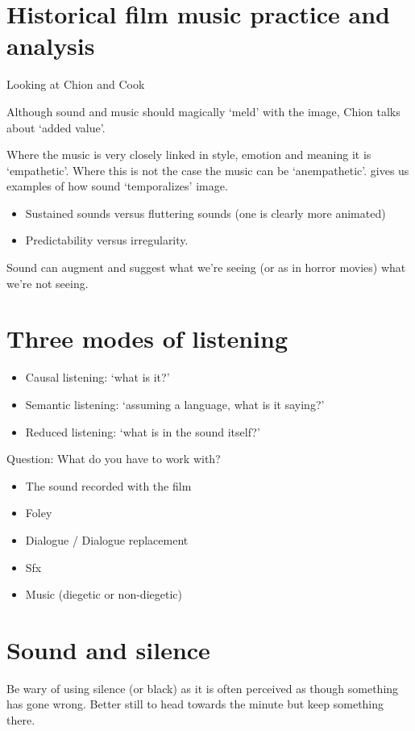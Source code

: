 \begin{table}[H]
\begin{tabular}{|p{5.0cm}|p{8.0cm}|}
\end{tabular}
\label{tab:composersandfilms}
\end{table}

\section{Historical film music practice and analysis}

Looking at Chion \citeyearpar{chion1990} and Cook \citeyearpar{cook1998analysing}

Although sound and music should magically `meld' with the image, Chion talks about `added value'. 

Where the music is very closely linked in style, emotion and meaning it is `empathetic'. Where this is not the case the music can be `anempathetic'. 
\citep[14-15]{chion1990} gives us examples of how sound `temporalizes' image.
\begin{itemize}
\item Sustained sounds versus fluttering sounds (one is clearly more animated)
\item Predictability versus irregularity. 
\end{itemize}

Sound can augment and suggest what we're seeing (or as in horror movies) what we're not seeing. 

\section{Three modes of listening}
\begin{itemize}
\item Causal listening: `what is it?'
\item Semantic listening: `assuming a language, what is it saying?'
\item Reduced listening: `what is in the sound itself?'
\end{itemize}

Question: What do you have to work with?
\begin{itemize}
\item The sound recorded with the film
\item Foley
\item Dialogue / Dialogue replacement
\item Sfx
\item Music (diegetic or non-diegetic)
\end{itemize}

\section{Sound and silence}
Be wary of using silence (or black) as it is often perceived as though something has gone wrong. Better still to head towards the minute but keep something there.


